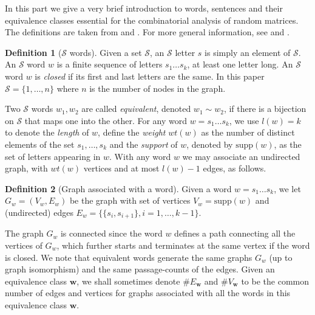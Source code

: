 \documentclass[12pt]{article}
\numberwithin{equation}{section}
\numberwithin{equation}{section}
\theoremstyle{definition}
\newtheorem{definition}{Definition}[section]
\renewcommand{\1}{\bf 1}
\begin{document}
In this part we give a very brief introduction to words, sentences and their equivalence classes essential for the combinatorial analysis of random matrices. 
The definitions are taken from \citet{AGZ} and \citet{AZ05}.
For more general information, see \cite[Chapter 1]{AGZ} and \cite{AZ05}. 
\begin{definition}[$\mathcal{S}$ words]
Given a set $\mathcal{S}$, an $\mathcal{S}$ letter $s$ is simply an element of
$\mathcal{S}$. An $\mathcal{S}$ word $w$ is a finite sequence of letters $s_1
\ldots s_k$, at least one letter long.
An $\mathcal{S}$ word $w$ is \emph{closed} if its first and last letters are the same. In this paper $\mathcal{S}=\{1,\ldots,n\}$ where $n$ is the number of nodes in the graph.
\end{definition}
Two $\mathcal{S}$ words
$w_1,w_2$ are called \emph{equivalent}, denoted $w_1\sim w_2$, if there is a bijection on $\mathcal{S}$ that
maps one into the other.
For any word $w = s_1 \ldots s_k$, we use $l(w) = k$ to denote the \emph{length} of $w$, define
the \emph{weight} $wt(w)$ as the number of distinct elements of the set ${s_1,\ldots , s_k
}$ and the
\emph{support} of $w$, denoted by $\mathrm{supp}(w)$, as the set of letters appearing in $w$. 
With any word $w$ we may associate an undirected graph, with $wt(w)$ vertices and at most $l(w)-1$ edges,
as follows.
\begin{definition}[Graph associated with a word] 
	\label{def:graphword}
Given a word $w = s_1 \ldots s_k$,
we let $G_w = (V_w,E_w)$ be the graph with set of vertices $V_w = \mathrm{supp}(w)$ and (undirected)
edges $E_w = \{\{s_i, s_{i+1}
\}, i = 1,\ldots ,k - 1
\}.$
\end{definition}
The graph $G_w$ is connected since the word $w$ defines a path connecting all the
vertices of $G_w$, which further starts and terminates at the same vertex if the word
is closed. 
We note that equivalent words generate the same
graphs $G_w$ (up to graph isomorphism) and the same passage-counts of the edges. 
Given an equivalence class $\mathbf{w}$, we shall sometimes denote $\#E_{\mathbf{w}}$ and $\#V_{\mathbf{w}}$ to be the common number of edges and vertices for graphs associated with all the words in this equivalence class $\mathbf{w}$. 
\end{document}
